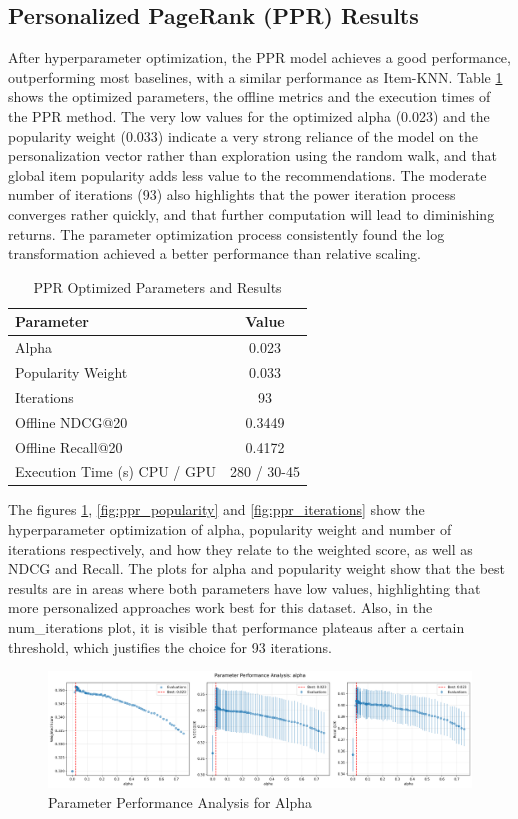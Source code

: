 \documentclass[conference,compsoc]{IEEEtran}
\begin{document}
\subsection{Personalized PageRank (PPR) Results}
After hyperparameter optimization, the PPR model achieves a good performance, outperforming most baselines, with a similar performance as Item-KNN. Table \ref{tab:ppr_results} shows the optimized parameters, the offline metrics and the execution times of the PPR method. The very low values for the optimized alpha (0.023) and the popularity weight (0.033) indicate a very strong reliance of the model on the personalization vector rather than exploration using the random walk, and that global item popularity adds less value to the recommendations. The moderate number of iterations (93) also highlights that the power iteration process converges rather quickly, and that further computation will lead to diminishing returns. The parameter optimization process consistently found the log transformation achieved a better performance than relative scaling.

\begin{table}[!ht]
\centering
\caption{PPR Optimized Parameters and Results}
    \label{tab:ppr_results}
\begin{tabular}{lc}
\toprule
\textbf{Parameter} & \textbf{Value} \\
\midrule
Alpha & 0.023 \\
Popularity Weight & 0.033 \\
Iterations & 93 \\
Offline NDCG@20 & 0.3449\\
Offline Recall@20 & 0.4172\\
Execution Time (s) CPU / GPU & 280 / 30-45 \\
\bottomrule
\end{tabular}
\end{table}
The figures \ref{fig:ppr_alpha},  \ref{fig:ppr_popularity} and \ref{fig:ppr_iterations} show the hyperparameter optimization of alpha, popularity weight and number of iterations respectively, and how they relate to the weighted score, as well as NDCG and Recall. The plots for alpha and popularity weight show that the best results are in areas where both parameters have low values, highlighting that more personalized approaches work best for this dataset. Also, in the num\_iterations plot, it is visible that performance plateaus after a certain threshold, which justifies the choice for 93 iterations.
\begin{figure}[!ht]
    \centering
    \includegraphics[width=\linewidth]{images/parameter_analysis_alpha.png}
    \caption{Parameter Performance Analysis for Alpha}
    \label{fig:ppr_alpha}
\end{figure}
\end{document}
